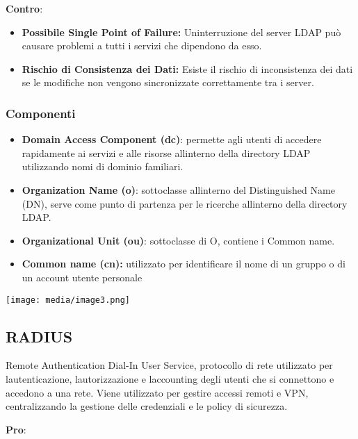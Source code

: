 \textbf{Contro}:

\begin{itemize}
\item
  \textbf{Possibile Single Point of Failure:}
  Un\textquotesingle interruzione del server LDAP può causare problemi a
  tutti i servizi che dipendono da esso.
\item
  \textbf{Rischio di Consistenza dei Dati:} Esiste il rischio di
  inconsistenza dei dati se le modifiche non vengono sincronizzate
  correttamente tra i server.
\end{itemize}

\subsubsection{Componenti}\label{componenti}

\begin{itemize}
\item
  \textbf{Domain Access Component (dc)}: permette agli utenti di
  accedere rapidamente ai servizi e alle risorse
  all\textquotesingle interno della directory LDAP utilizzando nomi di
  dominio familiari.
\item
  \textbf{Organization Name (o)}: sottoclasse
  all\textquotesingle interno del Distinguished Name (DN), serve come
  punto di partenza per le ricerche all\textquotesingle interno della
  directory LDAP.
\item
  \textbf{Organizational Unit (ou)}: sottoclasse di O, contiene i Common
  name.
\item
  \textbf{Common name (cn):} utilizzato per identificare il nome di un
  gruppo o di un account utente personale
\end{itemize}

\texttt{[image: media/image3.png]}

\subsection{RADIUS}\label{radius}

Remote Authentication Dial-In User Service, protocollo di rete
utilizzato per l\textquotesingle autenticazione,
l\textquotesingle autorizzazione e l\textquotesingle accounting degli
utenti che si connettono e accedono a una rete. Viene utilizzato per
gestire accessi remoti e VPN, centralizzando la gestione delle
credenziali e le policy di sicurezza.

\textbf{Pro}:

